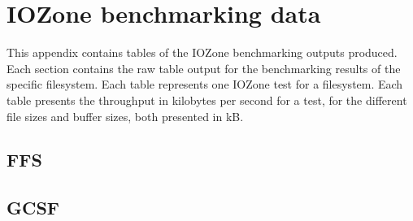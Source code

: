 \chapter{IOZone benchmarking data}
\label{app:bench_data}

This appendix contains tables of the IOZone benchmarking outputs produced. Each section contains the raw table output for the benchmarking results of the specific filesystem. Each table represents one IOZone test for a filesystem. Each table presents the throughput in kilobytes per second for a test, for the different file sizes and buffer sizes, both presented in kB.

\section{FFS}















\FloatBarrier

\newpage

\section{GCSF}















